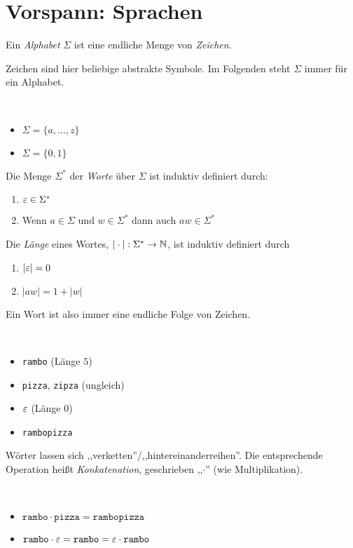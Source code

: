 \section[Vorspann: Sprachen]{Vorspann: Sprachen}
\begin{Def}[name={[Alphabet $\Sigma$]}]
	Ein \emph{Alphabet} $\Sigma$ ist eine endliche Menge von \emph{Zeichen}.
\end{Def} %
Zeichen sind hier beliebige abstrakte Symbole.
Im Folgenden steht $\Sigma$ immer für ein Alphabet.
\begin{Bsp*} ~
  \begin{itemize}
  \item $\Sigma = \{a,\dots,z\}$
  \item $\Sigma = \{0, 1\}$
  \end{itemize}
\end{Bsp*}
\begin{Def}[name={[Wort $w$ über $\Sigma$]}]\label{def:1.2}
	Die Menge $\Sigma^*$ der \emph{Worte} über $\Sigma$ ist induktiv definiert durch:
  \begin{enumerate}
  \item $\varepsilon \in \Sigma^*$
  \item Wenn $a \in \Sigma$ und $w \in \Sigma^*$ dann auch $aw \in \Sigma^*$
  \end{enumerate}
  Die \emph{Länge} eines Wortes, $|\cdot| : \Sigma^* \to \mathbb{N}$, ist induktiv definiert durch
  \begin{enumerate}
  \item $|\varepsilon| = 0$
  \item $|aw| = 1 + |w|$
  \end{enumerate}
\end{Def}
Ein Wort ist also immer eine endliche Folge von Zeichen.
\begin{Bsp*} ~
  \begin{itemize}
  \item \verb/rambo/ (Länge $5$)
  \item \verb/pizza/, \verb/zipza/ (ungleich) 
  \item $\varepsilon$ (Länge $0$)
  \item \verb/rambopizza/
  \end{itemize}
\end{Bsp*}
Wörter lassen sich ,,verketten''/,,hintereinanderreihen''.
Die entsprechende Operation heißt \emph{Konkatenation}, geschrieben ,,$\cdot$'' (wie Multiplikation).
\begin{Bsp*} ~
  \begin{itemize}
  \item $\mathtt{rambo}\cdot\mathtt{pizza} = \mathtt{rambopizza}$
  \item $\mathtt{rambo} \cdot \varepsilon = \mathtt{rambo} = \varepsilon \cdot \mathtt{rambo}$ 
  \end{itemize}
\end{Bsp*}
